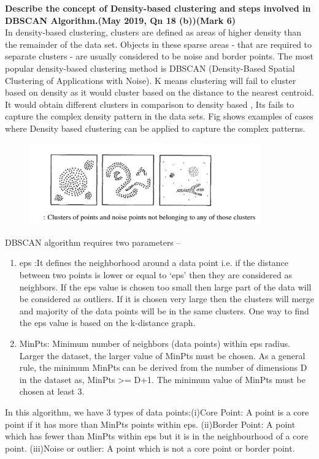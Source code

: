 
\textbf{\textcolor{LightMagenta}{Describe the concept of Density-based clustering and steps involved in DBSCAN Algorithm.(May 2019, Qn 18 (b))\hfill (Mark 6)}} \\[5pt]
In density-based clustering, clusters are defined as areas of higher density than the remainder of the data set. Objects in these sparse areas - that are required to separate clusters - are usually considered to be noise and border points. The most popular density-based clustering method is DBSCAN (Density-Based Spatial Clustering of Applications with Noise). K means clustering will fail to cluster based on density as it would cluster based on the distance to the nearest centroid. It would obtain different clusters in comparison to density based , Its fails to capture the complex density pattern in the data sets. 
Fig shows examples of cases where Density based clustering can be applied to capture the complex patterns.
\begin{figure}[htp]
    \centering
    \includegraphics[width=10cm]{Images/A39_img1.png}
 \end{figure}

DBSCAN algorithm requires two parameters –

\begin{enumerate}
    \item eps :It defines the neighborhood around a data point i.e. if the distance between two points is lower or equal to ‘eps’ then they are considered as neighbors. If the eps value is chosen too small then large part of the data will be considered as outliers. If it is chosen very large then the clusters will merge and majority of the data points will be in the same clusters. One way to find the eps value is based on the k-distance graph.
    \item MinPts: Minimum number of neighbors (data points) within eps radius. Larger the dataset, the larger value of MinPts must be chosen. As a general rule, the minimum MinPts can be derived from the number of dimensions D in the dataset as, MinPts >= D+1. The minimum value of MinPts must be chosen at least 3.
\end{enumerate}
In this algorithm, we have 3 types of data points:(i)Core Point: A point is a core point if it has more than MinPts points within eps.
(ii)Border Point: A point which has fewer than MinPts within eps but it is in the neighbourhood of a core point.
(iii)Noise or outlier: A point which is not a core point or border point.



